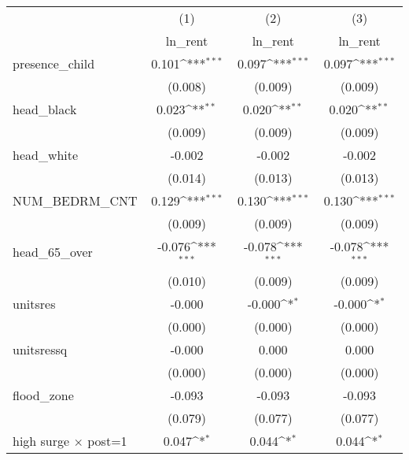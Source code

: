 {
\def\sym#1{\ifmmode^{#1}\else\(^{#1}\)\fi}
\begin{tabular}{l*{3}{c}}
\toprule
                    &\multicolumn{1}{c}{(1)}&\multicolumn{1}{c}{(2)}&\multicolumn{1}{c}{(3)}\\
                    &\multicolumn{1}{c}{ln\_rent}&\multicolumn{1}{c}{ln\_rent}&\multicolumn{1}{c}{ln\_rent}\\
\midrule
presence\_child      &       0.101\sym{***}&       0.097\sym{***}&       0.097\sym{***}\\
                    &     (0.008)         &     (0.009)         &     (0.009)         \\
\addlinespace
head\_black          &       0.023\sym{**} &       0.020\sym{**} &       0.020\sym{**} \\
                    &     (0.009)         &     (0.009)         &     (0.009)         \\
\addlinespace
head\_white          &      -0.002         &      -0.002         &      -0.002         \\
                    &     (0.014)         &     (0.013)         &     (0.013)         \\
\addlinespace
NUM\_BEDRM\_CNT       &       0.129\sym{***}&       0.130\sym{***}&       0.130\sym{***}\\
                    &     (0.009)         &     (0.009)         &     (0.009)         \\
\addlinespace
head\_65\_over        &      -0.076\sym{***}&      -0.078\sym{***}&      -0.078\sym{***}\\
                    &     (0.010)         &     (0.009)         &     (0.009)         \\
\addlinespace
unitsres            &      -0.000         &      -0.000\sym{*}  &      -0.000\sym{*}  \\
                    &     (0.000)         &     (0.000)         &     (0.000)         \\
\addlinespace
unitsressq          &      -0.000         &       0.000         &       0.000         \\
                    &     (0.000)         &     (0.000)         &     (0.000)         \\
\addlinespace
flood\_zone          &      -0.093         &      -0.093         &      -0.093         \\
                    &     (0.079)         &     (0.077)         &     (0.077)         \\
\addlinespace
high surge $\times$ post=1&       0.047\sym{*}  &       0.044\sym{*}  &       0.044\sym{*}  \\

\end{tabular}}
